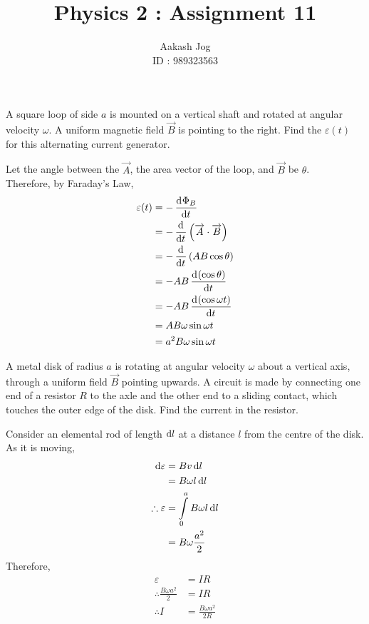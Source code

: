 \documentclass[fleqn, a4paper, 11pt, oneside]{amsart}
\title{Physics 2 : Assignment 11}
\author
{
	Aakash Jog\\
	ID : 989323563
}
\date{\formatdate{3}{6}{2015}}
\theoremstyle{definition}
\theoremstyle{theorem}
\begin{document}

\maketitle

\begin{question}
	A square loop of side $a$ is mounted on a vertical shaft and rotated at angular velocity $\omega$.
	A uniform magnetic field $\overrightarrow{B}$ is pointing to the right.
	Find the $\varepsilon(t)$ for this alternating current generator.
\end{question}

\begin{solution}
	Let the angle between the $\overrightarrow{A}$, the area vector of the loop, and $\overrightarrow{B}$ be $\theta$.\\
	Therefore, by Faraday's Law,
	\begin{align*}
		\varepsilon(t) &= -\dod{\Phi_B}{t}\\
		&= -\dod{}{t}\left( \overrightarrow{A} \cdot \overrightarrow{B} \right)\\
		&= -\dod{}{t}\left( A B \cos \theta \right)\\
		&= -A B \dod{(\cos \theta)}{t}\\
		&= -A B \dod{(\cos \omega t)}{t}\\
		&= A B \omega \sin \omega t\\
		&= a^2 B \omega \sin \omega t
	\end{align*}
\end{solution}

\begin{question}
	A metal disk of radius $a$ is rotating at angular velocity $\omega$ about a vertical axis, through a uniform field $\overrightarrow{B}$ pointing upwards.
	A circuit is made by connecting one end of a resistor $R$ to the axle and the other end to a sliding contact, which touches the outer edge of the disk.
	Find the current in the resistor.
\end{question}

\begin{solution}
	Consider an elemental rod of length $\dif l$ at a distance $l$ from the centre of the disk.\\
	As it is moving,
	\begin{align*}
		\dif \varepsilon &= B v \dif l\\
		&= B \omega l \dif l\\
		\therefore \varepsilon &= \int\limits_{0}^{a} B \omega l \dif l\\
		&= B \omega \frac{a^2}{2}
	\end{align*}
	Therefore,
	\begin{align*}
		\varepsilon &= I R\\
		\therefore \frac{B \omega a^2}{2} &= I R\\
		\therefore I &= \frac{B \omega a^2}{2 R}
	\end{align*}
\end{solution}
\end{document}
